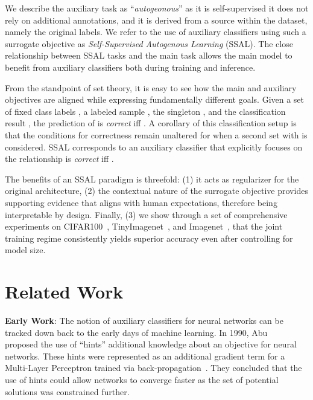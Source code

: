 \documentclass[10pt,twocolumn,letterpaper]{article}
\begin{document}
We describe the auxiliary task as ``\emph{autogeonous}'' as it is self-supervised \ie it does not rely on additional annotations, and it is derived from a source within the dataset, namely the original labels.
We refer to the use of auxiliary classifiers using such a surrogate objective as \emph{Self-Supervised Autogenous Learning} (SSAL).
The close relationship between SSAL tasks and the main task allows the main model to benefit from auxiliary classifiers both during training and inference.

From the standpoint of set theory, it is easy to see how the main and auxiliary objectives are aligned while expressing fundamentally different goals.
Given a set of fixed class labels , a labeled sample , the singleton , and the classification result , the prediction of  is \emph{correct} iff .
A corollary of this classification setup is that the conditions for correctness remain unaltered for  when a second set  with  is considered.
SSAL corresponds to an auxiliary classifier  that explicitly focuses on the relationship  is \emph{correct} iff .

The benefits of an SSAL paradigm is threefold: (1) it acts as regularizer for the original architecture, (2) the contextual nature of the surrogate objective provides supporting evidence that aligns with human expectations, therefore being interpretable by design.
Finally, (3) we show through a set of comprehensive experiments on CIFAR100~\cite{krizhevsky2009learning}, TinyImagenet~\cite{tinyimagenet}, and Imagenet~\cite{russakovsky2015imagenet}, that the joint training regime consistently yields superior accuracy even after controlling for model size.


\section{Related Work}
\label{sec:relatedwork}

\textbf{Early Work}: The notion of auxiliary classifiers for neural networks can be tracked down back to the early days of machine learning.  In 1990, Abu \etal~\cite{abu1990learning} proposed the use of ``hints'' \ie additional knowledge about an objective for neural networks.
These hints were represented as an additional gradient term for a Multi-Layer Perceptron trained via back-propagation~\cite{rumelhart1983learning}.
They concluded that the use of hints could allow networks to converge faster as the set of potential solutions was constrained further.
\end{document}
